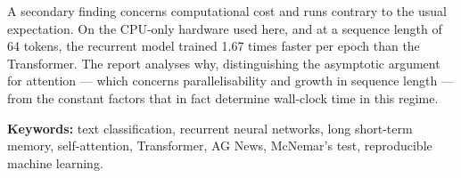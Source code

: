 \documentclass[11pt,a4paper,oneside]{report}
\begin{document}
A secondary finding concerns computational cost and runs contrary to the usual expectation. On the
CPU-only hardware used here, and at a sequence length of 64 tokens, the recurrent model trained
1.67 times faster per epoch than the Transformer. The report analyses why, distinguishing the
asymptotic argument for attention --- which concerns parallelisability and growth in sequence
length --- from the constant factors that in fact determine wall-clock time in this regime.

\vspace{8pt}
\noindent\textbf{Keywords:} text classification, recurrent neural networks, long short-term memory,
self-attention, Transformer, AG News, McNemar's test, reproducible machine learning.

\tableofcontents
\listoffigures
\listoftables

\clearpage
{}
\setcounter{page}{1}












\end{document}
